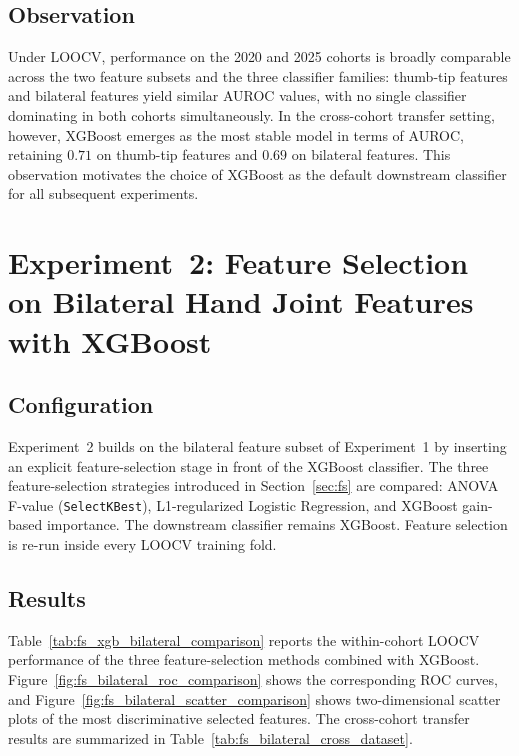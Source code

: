 \subsection{Observation}

Under LOOCV, performance on the 2020 and 2025 cohorts is broadly comparable across the two feature subsets and the three classifier families: thumb-tip features and bilateral features yield similar AUROC values, with no single classifier dominating in both cohorts simultaneously. In the cross-cohort transfer setting, however, XGBoost emerges as the most stable model in terms of AUROC, retaining $0.71$ on thumb-tip features and $0.69$ on bilateral features. This observation motivates the choice of XGBoost as the default downstream classifier for all subsequent experiments.

\section{Experiment~2: Feature Selection on Bilateral Hand Joint Features with XGBoost}
\label{sec:exp2}

\subsection{Configuration}

Experiment~2 builds on the bilateral feature subset of Experiment~1 by inserting an explicit feature-selection stage in front of the XGBoost classifier. The three feature-selection strategies introduced in Section~\ref{sec:fs} are compared: ANOVA F-value (\texttt{SelectKBest}), L1-regularized Logistic Regression, and XGBoost gain-based importance. The downstream classifier remains XGBoost. Feature selection is re-run inside every LOOCV training fold.

\subsection{Results}

Table~\ref{tab:fs_xgb_bilateral_comparison} reports the within-cohort LOOCV performance of the three feature-selection methods combined with XGBoost. Figure~\ref{fig:fs_bilateral_roc_comparison} shows the corresponding ROC curves, and Figure~\ref{fig:fs_bilateral_scatter_comparison} shows two-dimensional scatter plots of the most discriminative selected features. The cross-cohort transfer results are summarized in Table~\ref{tab:fs_bilateral_cross_dataset}.

